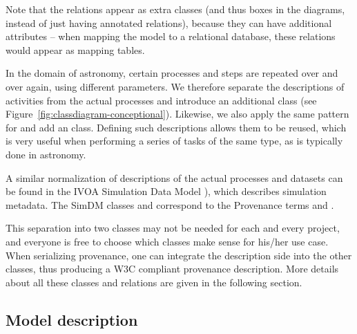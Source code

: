 Note that the relations appear as extra classes (and thus boxes in the diagrams, instead of just having annotated relations), because they can have additional attributes -- when mapping the model to a relational database, these relations would appear as mapping tables.

In the domain of astronomy, certain processes and steps are repeated over and
over again, using different parameters. We therefore separate the descriptions
of activities from the actual processes and introduce an additional
 class (see
Figure~\ref{fig:classdiagram-conceptional}). Likewise, we also apply the same
pattern for  and add an  class.
Defining such descriptions allows them to be reused, which is very useful 
when performing a series of tasks of the same type, as is typically done in 
astronomy. 

A similar normalization of descriptions of the actual processes and datasets 
can be found in the IVOA Simulation Data Model \citep[SimDM, ][]{std:SimDM}),
which describes simulation metadata. The SimDM classes  and  
correspond to the Provenance terms  and .


This separation into two classes may not be needed for each and every project,
and everyone is free to choose which classes make sense for his\slash{}her use
case. When serializing provenance, one can integrate the description side into
the  other classes, thus producing a W3C compliant provenance description. More
details about  all these classes and relations are given in the following
section.





\subsection{Model description}


